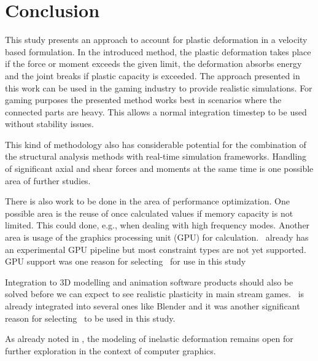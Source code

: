 \section{Conclusion}

This study presents an approach to account for plastic deformation in 
a velocity based formulation.
In the introduced method, the plastic deformation takes place if the force or moment exceeds the given 
limit, the deformation absorbs energy and the joint breaks if plastic capacity is exceeded. 
The approach presented in this work can be used in the gaming industry to provide realistic 
simulations. 
For gaming purposes the presented method works 
best in scenarios where the connected parts are heavy. This allows a normal 
integration timestep to be used without stability issues. 

This kind of methodology also has considerable potential for the combination of
the structural analysis methods with real-time simulation frameworks.
Handling of significant axial and shear forces and moments at the same time
is one possible area of further studies.

There is also work to be done in the area of performance optimization.
One possible area is the reuse of once calculated values if memory capacity is not limited.
This could done, e.g., when dealing with high frequency modes.
Another area is usage of the graphics processing unit (GPU) for calculation.
\bullet\ already has an experimental GPU pipeline but most constraint types are not 
yet supported. GPU support was one reason for selecting
\bullet\ for use in this study

Integration to 3D modelling and animation software products 
should also be solved before we can expect to
see realistic plasticity in main stream games. 
\bullet\ is already integrated into several ones like Blender 
and it was another significant reason for selecting
\bullet\  to be used in this study.

As already noted in \cite{cg1988}, the modeling of inelastic deformation
remains open for further exploration in the context of computer graphics.

